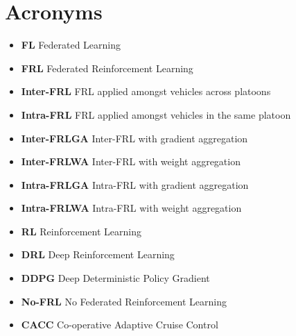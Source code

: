 \documentclass[oneside, 12pt]{book}
\let\oldmainmatter\mainmatter
\gdef\mainmatter{\oldmainmatter\pagestyle{myfancy}}
\begin{document}
\chapter*{Acronyms}
\begin{itemize}[label={}]
	\singlespacing
	\item \textbf{FL} Federated Learning \\
	\item \textbf{FRL} Federated Reinforcement Learning \\
	\item \textbf{Inter-FRL}  FRL applied amongst vehicles across platoons \\
	\item \textbf{Intra-FRL}  FRL applied amongst vehicles in the same platoon \\
	\item \textbf{Inter-FRLGA} Inter-FRL with gradient aggregation \\
	\item \textbf{Inter-FRLWA} Inter-FRL with weight aggregation \\
	\item \textbf{Intra-FRLGA} Intra-FRL with gradient aggregation \\
	\item \textbf{Intra-FRLWA} Intra-FRL with weight aggregation \\
	\item \textbf{RL} Reinforcement Learning \\
	\item \textbf{DRL} Deep Reinforcement Learning \\
	\item \textbf{DDPG} Deep Deterministic Policy Gradient \\
	\item \textbf{No-FRL}  No Federated Reinforcement Learning \\
	\item \textbf{CACC} Co-operative Adaptive Cruise Control
\end{itemize}

\doublespacing
\mainmatter
\makeatletter
\renewcommand\chapter{\if@openright\cleardoublepage\else\clearpage\fi
                    \thispagestyle{fancy}%
                    \global\@topnum\z@
                    \@afterindentfalse
                    \secdef\@chapter\@schapter}
\makeatother









\end{document}
